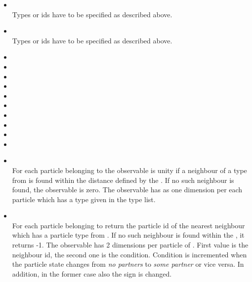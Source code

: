   \begin{itemize}
    \item {} \\
          Types or ids have to be specified as described above.
    \item {}\\
          Types or ids have to be specified as described above.
    \item {}
    \item {}
    \item {}
    \item {} 
    \item {}
    \item {}
    \item {}
    \item {}
    \item {}
    \item {}
    \item {} \\
          For each particle belonging to  the observable is unity if 
	  a neighbour of a type from  is found within the distance 
	  defined by the . If no such neighbour is found, the observable is
	  zero. 
	  The observable has as one dimension per each particle which has a type 
	  given in the type list.
    \item {} \\
          For each particle belonging to  return the particle id
	  of the nearest neighbour which has a particle type from . 
	  If no such neighbour is found within the , it returns -1. 
	  The observable has 2 dimensions per particle of . First
	  value is the neighbour id, the second one is the condition. Condition is
	  incremented when the particle state changes from \emph{no partners}
	  to \emph{some partner} or vice versa. In addition, in the former case
	  also the sign is changed.
          

\end{itemize}
